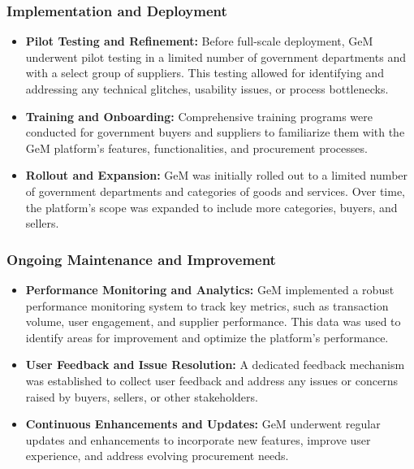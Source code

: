 \subsubsection{Implementation and Deployment}

\begin{itemize}
    \item \textbf{Pilot Testing and Refinement:} Before full-scale deployment, GeM underwent pilot testing in a limited number of government departments and with a select group of suppliers. This testing allowed for identifying and addressing any technical glitches, usability issues, or process bottlenecks.
    
    \item \textbf{Training and Onboarding:} Comprehensive training programs were conducted for government buyers and suppliers to familiarize them with the GeM platform's features, functionalities, and procurement processes.
    
    \item \textbf{Rollout and Expansion:} GeM was initially rolled out to a limited number of government departments and categories of goods and services. Over time, the platform's scope was expanded to include more categories, buyers, and sellers.
\end{itemize}

\subsubsection{Ongoing Maintenance and Improvement}

\begin{itemize}
    \item \textbf{Performance Monitoring and Analytics:} GeM implemented a robust performance monitoring system to track key metrics, such as transaction volume, user engagement, and supplier performance. This data was used to identify areas for improvement and optimize the platform's performance.
    
    \item \textbf{User Feedback and Issue Resolution:} A dedicated feedback mechanism was established to collect user feedback and address any issues or concerns raised by buyers, sellers, or other stakeholders.
    
    \item \textbf{Continuous Enhancements and Updates:} GeM underwent regular updates and enhancements to incorporate new features, improve user experience, and address evolving procurement needs.
\end{itemize}

